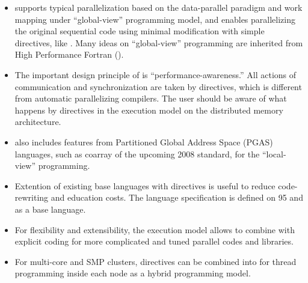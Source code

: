 \begin{itemize}

 \item {\XMP} supports typical parallelization based on the
       data-parallel paradigm and work mapping under ``global-view''
       programming model, and enables parallelizing the original
       sequential code using minimal modification with simple
       directives, like {\OMP}. Many ideas on ``global-view''
       programming are inherited from High Performance Fortran ({\HPF}).

 \item The important design principle of {\XMP} is
       ``performance-awareness.'' All actions of communication and
       synchronization are taken by directives, which is different from
       automatic parallelizing compilers. The user should be aware of
       what happens by {\XMP} directives in the execution model on the
       distributed memory architecture.

 \item {\XMP} also includes features from Partitioned Global Address
       Space (PGAS) languages, such as coarray of the upcoming {\Fort}
       2008 standard, for the ``local-view'' programming.

 \item Extention of existing base languages with directives is useful to
       reduce code-rewriting and education costs. The {\XMP} language
       specification is defined on {\Fort} 95 and {\C} as a base
       language.

 \item For flexibility and extensibility, the execution model allows to
       combine with explicit {\MPI} coding for more complicated and
       tuned parallel codes and libraries.

 \item For multi-core and SMP clusters, {\OMP} directives can be
       combined into {\XMP} for thread programming inside each node as a
       hybrid programming model.


\end{itemize}
